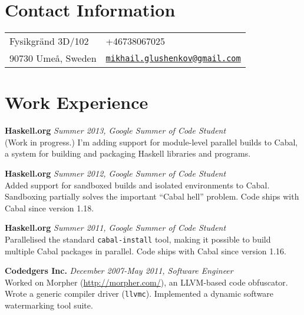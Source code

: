 \documentclass[margin,line]{res}
\begin{document}

\begin{resume}
\section{\sc Contact Information}
\vspace{.05in}
\begin{tabular}{@{}p{2in}p{4in}}
Fysikgränd 3D/102&
+46738067025\\
90730 Umeå, Sweden&
\href{mailto:mikhail.glushenkov@gmail.com}
{\texttt{mikhail.glushenkov@gmail.com}}\\
\end{tabular}

\section{\sc Work Experience}

{\bf Haskell.org} \hfill {\it Summer 2013, Google Summer of Code Student}\\
(Work in progress.) I'm adding support for module-level parallel builds to
Cabal, a system for building and packaging Haskell libraries and programs.


{\bf Haskell.org} \hfill {\it Summer 2012, Google Summer of Code Student}\\
Added support for sandboxed builds and isolated environments to
Cabal. Sandboxing partially solves the important ``Cabal hell'' problem. Code
ships with Cabal since version 1.18.

{\bf Haskell.org} \hfill {\it Summer 2011, Google Summer of Code Student}\\
Parallelised the standard \texttt{cabal-install} tool, making it possible to
build multiple Cabal packages in parallel. Code ships with Cabal since version
1.16.

{\bf Codedgers Inc.} \hfill {\it December 2007-May 2011, Software Engineer}\\
Worked on Morpher (\url{http://morpher.com/}), an LLVM-based code
obfuscator. Wrote a generic compiler driver (\texttt{llvmc}). Implemented a
dynamic software watermarking tool suite.



\end{resume}
\end{document}
